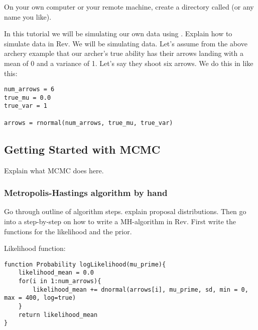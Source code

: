 {\begin{framed}
On your own computer or your remote machine, create a directory called {\textcolor{red}{}} (or any name you like).

\end{framed}}

In this tutorial we will be simulating our own data using \RevBayes. Explain how to simulate data in Rev. We will be simulating data. Let's assume from the above archery example that our archer's true ability has their arrows landing with a mean of 0 and a variance of 1. Let's say they shoot six arrows. We do this in \RevBayes like this:

 {\tt \begin{snugshade*}
\begin{lstlisting}
num_arrows = 6
true_mu = 0.0
true_var = 1

arrows = rnormal(num_arrows, true_mu, true_var)

\end{lstlisting}
\end{snugshade*}}



\bigskip
\subsection{Getting Started with MCMC\label{subsect:Exercise-GetStart}}

Explain what MCMC does here.

\subsubsection{Metropolis-Hastings algorithm by hand}

Go through outline of algorithm steps. explain proposal distributions. Then go into a step-by-step on how to write a MH-algorithm in Rev. First write the functions for the likelihood and the prior. 

Likelihood function:

{\tt \begin{snugshade*}
\begin{lstlisting}
function Probability logLikelihood(mu_prime){
	likelihood_mean = 0.0
	for(i in 1:num_arrows){
		likelihood_mean += dnormal(arrows[i], mu_prime, sd, min = 0, max = 400, log=true)
	}
	return likelihood_mean
}
\end{lstlisting}
\end{snugshade*}}

